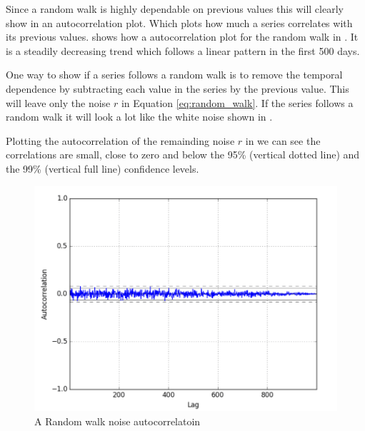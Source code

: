 Since a random walk is highly dependable on previous values this will clearly show in an autocorrelation plot.
Which plots how much a series correlates with its previous values.
 shows how a autocorrelation plot for the random walk in .
It is a steadily decreasing trend which follows a linear pattern in the first 500 days.

One way to show if a series follows a random walk is to remove the temporal dependence by subtracting each value in the series by the previous value.
This will leave only the noise $r$ in Equation \cref{eq:random_walk}.
If the series follows a random walk it will look a lot like the white noise shown in .

Plotting the autocorrelation of the remainding noise $r$ in 
we can see the correlations are small, close to zero and below the 95\% (vertical dotted line) and the 99\% (vertical full line)
confidence levels.
\begin{figure}[h!]
  \centering
  \includegraphics[width=\textwidth]{./figs/illustrations/random_walk_noise_autocorrelation.png}
  \hfill
  \caption{A Random walk noise autocorrelatoin}
  \label{fig:dataset:random_walk_noise_autocorrelation}
\end{figure}
